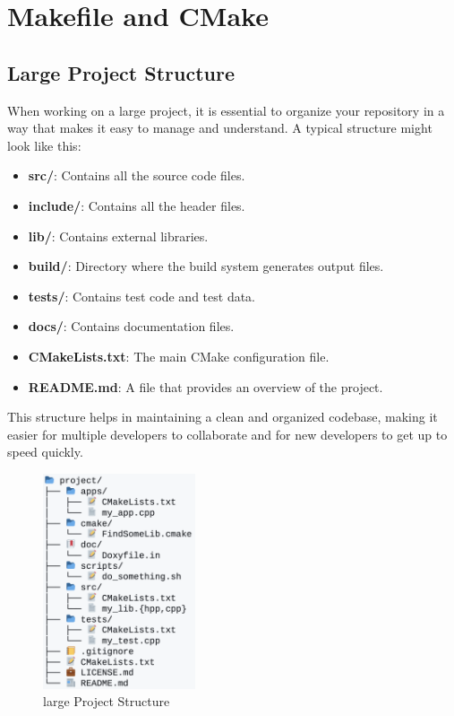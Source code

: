 \chapter{Makefile and CMake}

\section{Large Project Structure}

When working on a large project, it is essential to organize your repository in a way that makes it easy to manage and understand. A typical structure might look like this:

\begin{itemize}
    \item \textbf{src/}: Contains all the source code files.
    \item \textbf{include/}: Contains all the header files.
    \item \textbf{lib/}: Contains external libraries.
    \item \textbf{build/}: Directory where the build system generates output files.
    \item \textbf{tests/}: Contains test code and test data.
    \item \textbf{docs/}: Contains documentation files.
    \item \textbf{CMakeLists.txt}: The main CMake configuration file.
    \item \textbf{README.md}: A file that provides an overview of the project.
\end{itemize}

This structure helps in maintaining a clean and organized codebase, making it easier for multiple developers to collaborate and for new developers to get up to speed quickly.

\begin{figure}[H]
    \centering 
    \includegraphics[width=0.4\textwidth]{assets/large_project.png}
    \caption{large Project Structure}
\end{figure}

